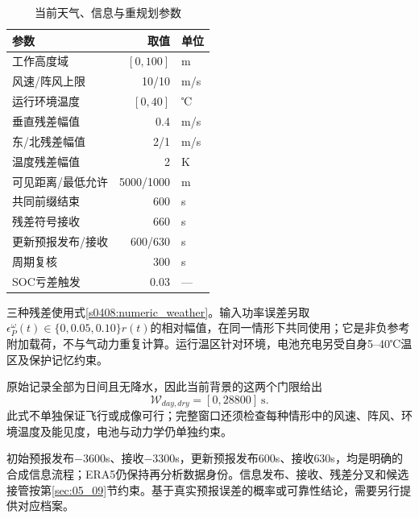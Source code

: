 \begin{table}[!ht]\centering
\caption{当前天气、信息与重规划参数}
\begin{tabular}{lrl}\toprule
参数 & 取值 & 单位\\\midrule
工作高度域 & $[0,100]$ & m\\
风速/阵风上限 & 10/10 & m/s\\
运行环境温度 & $[0,40]$ & ℃\\
垂直残差幅值 & 0.4 & m/s\\
东/北残差幅值 & 2/1 & m/s\\
温度残差幅值 & 2 & K\\
可见距离/最低允许 & 5000/1000 & m\\
共同前缀结束 & 600 & s\\
残差符号接收 & 660 & s\\
更新预报发布/接收 & 600/630 & s\\
周期复核 & 300 & s\\
SOC亏差触发 & 0.03 & ---\\\bottomrule
\end{tabular}\end{table}

三种残差使用式\eqref{s0408:numeric_weather}。输入功率误差另取$\epsilon_P^\omega(t)\in\{0,0.05,0.10\}r(t)$的相对幅值，在同一情形下共同使用；它是非负参考附加载荷，不与气动力重复计算。运行温区针对环境，电池充电另受自身5--40℃温区及保护记忆约束。

原始记录全部为日间且无降水，因此当前背景的这两个门限给出
\begin{equation}
 \mathcal W_{day,dry}=[0,28800]\ \mathrm s.
 \label{s0601:weather_window_difference}
\end{equation}
此式不单独保证飞行或成像可行；完整窗口还须检查每种情形中的风速、阵风、环境温度及能见度，电池与动力学仍单独约束。

初始预报发布$-3600$s、接收$-3300$s，更新预报发布600s、接收630s，均是明确的合成信息流程；ERA5仍保持再分析数据身份\cite{OpenMeteoHistory,OpenMeteoRuns}。信息发布、接收、残差分叉和候选接管按第\ref{sec:05_09}节约束。基于真实预报误差的概率或可靠性结论，需要另行提供对应档案。


